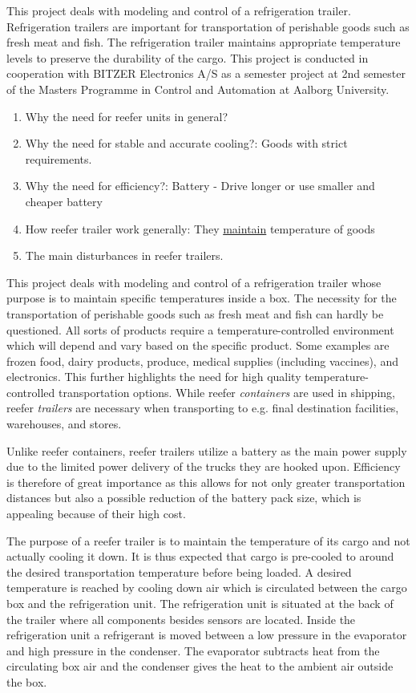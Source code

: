 This project deals with modeling and control of a refrigeration trailer. Refrigeration trailers are important for transportation of perishable goods such as fresh meat and fish. The refrigeration trailer maintains appropriate temperature levels to preserve the durability of the cargo.
This project is conducted in cooperation with BITZER Electronics A/S as a semester project at 2nd semester of the Masters Programme in Control and Automation at Aalborg University.

\begin{enumerate}
	\item Why the need for reefer units in general?
	\item Why the need for stable and accurate cooling?: Goods with strict requirements.
	\item Why the need for efficiency?: Battery - Drive longer or use smaller and cheaper battery
	\item How reefer trailer work generally: They \underline{maintain} temperature of goods
	\item The main disturbances in reefer trailers.
\end{enumerate}

This project deals with modeling and control of a refrigeration trailer whose purpose is to maintain specific temperatures inside a box. The necessity for the transportation of perishable goods such as fresh meat and fish can hardly be questioned. All sorts of products require a temperature-controlled environment which will depend and vary based on the specific product. Some examples are frozen food, dairy products, produce, medical supplies (including vaccines), and electronics. This further highlights the need for high quality temperature-controlled transportation options. While reefer \textit{containers} are used in shipping, reefer \textit{trailers} are necessary when transporting to e.g. final destination facilities, warehouses, and stores.

Unlike reefer containers, reefer trailers utilize a battery as the main power supply due to the limited power delivery of the trucks they are hooked upon. Efficiency is therefore of great importance as this allows for not only greater transportation distances but also a possible reduction of the battery pack size, which is appealing because of their high cost.

The purpose of a reefer trailer is to maintain the temperature of its cargo and not actually cooling it down. It is thus expected that cargo is pre-cooled to around the desired transportation temperature before being loaded. A desired temperature is reached by cooling down air which is circulated between the cargo box and the refrigeration unit. The refrigeration unit is situated at the back of the trailer where all components besides sensors are located. Inside the refrigeration unit a refrigerant is moved between a low pressure in the evaporator and high pressure in the condenser. The evaporator subtracts heat from the circulating box air and the condenser gives the heat to the ambient air outside the box.

